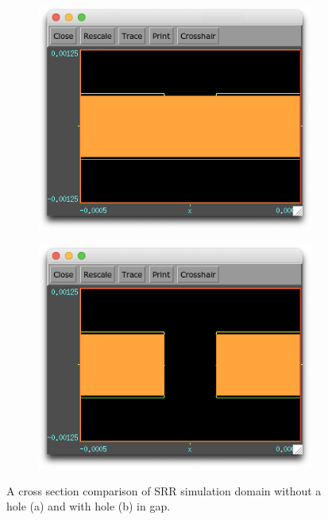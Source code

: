\begin{figure}
    \centering
    \begin{subfigure}{0.5\textwidth}
        \centering
        \includegraphics[width=0.9\linewidth]{chapter_4/figures/SRR_no_gap_start.png}
        \caption{}
        \label{fig:SRR_no_gap_start}
    \end{subfigure}%
    \begin{subfigure}{.5\textwidth}
        \centering
        \includegraphics[width=0.9\linewidth]{chapter_4/figures/SRR_with_gap_start.png}
        \caption{}
        \label{fig:SRR_with_gap_start}
    \end{subfigure}
    \caption{A cross section comparison of SRR simulation domain without a hole (a) and with hole (b) in gap.}
    \label{fig:SRR_hole_comparison_start}
\end{figure}

